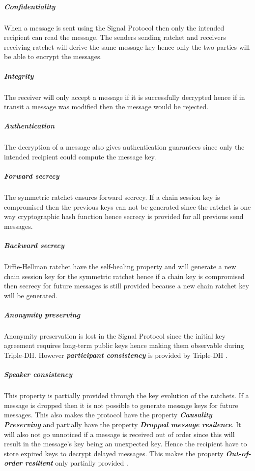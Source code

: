 

\subparagraph{Confidentiality} When a message is sent using the Signal Protocol then only the intended recipient can read the message. The senders sending ratchet and receivers receiving ratchet will derive the same message key hence only the two parties will be able to encrypt the messages. 

\subparagraph{Integrity} The receiver will only accept a message if it is successfully decrypted hence if in transit a message was modified then the message would be rejected.

\subparagraph{Authentication} The decryption of a message also gives authentication guarantees since only the intended recipient could compute the message key.

\subparagraph{Forward secrecy} The symmetric ratchet ensures forward secrecy. If a chain session key is compromised then the previous keys can not be generated since the ratchet is one way cryptographic hash function hence secrecy is provided for all previous send messages.  

\subparagraph{Backward secrecy} Diffie-Hellman ratchet have the self-healing property and will generate a new chain session key for the symmetric ratchet hence if a chain key is compromised then secrecy for future messages is still provided because a new chain ratchet key will be generated.

\subparagraph{Anonymity preserving}

Anonymity preservation is lost in the Signal Protocol since the initial key agreement requires long-term public keys hence making them observable during Triple-DH. However \textbf{\emph{participant consistency}} is provided by Triple-DH \cite{sok}. %

\subparagraph{Speaker consistency}
This property is partially provided through the key evolution of the ratchets. If a message is dropped then it is not possible to generate message keys for future messages. This also makes the protocol have the property \textbf{\emph{Causality Preserving}} and partially have the property \emph{\textbf{Dropped message resilence}}. It will also not go unnoticed if a message is received out of order since this will result in the message's key being an unexpected key. Hence the recipient have to store expired keys to decrypt delayed messages. This makes the property \emph{\textbf{Out-of-order resilient}} only partially provided \cite{sok}.

